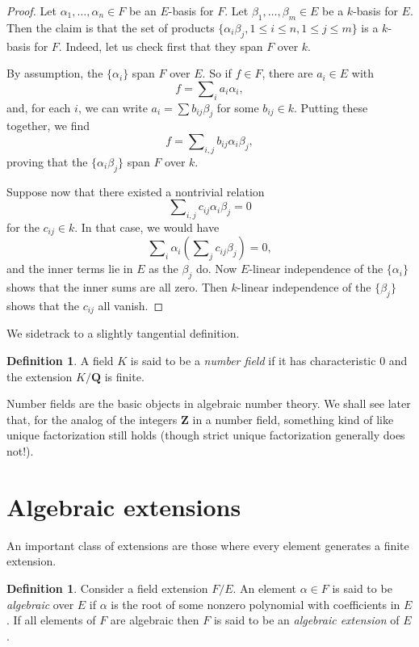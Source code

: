 \documentclass{stacks-project}
\theoremstyle{plain}
\theoremstyle{definition}
\newtheorem{definition}[subsection]{Definition}
\theoremstyle{remark}
\numberwithin{equation}{subsection}
\begin{document}
\begin{proof}
Let $\alpha_1, \ldots, \alpha_n \in F$ be an $E$-basis for $F$. Let
$\beta_1, \ldots, \beta_m \in E$ be a $k$-basis for $E$. Then the claim is
that the set of products
$\{\alpha_i \beta_j, 1 \leq i \leq n, 1 \leq j \leq m\}$
is a $k$-basis for $F$. Indeed, let us check first that they span $F$ over $k$.

\medskip\noindent
By assumption, the $\{\alpha_i\}$ span $F$ over $E$. So if
$f \in F$, there are $a_i \in E$ with
$$
f = \sum\nolimits_i a_i \alpha_i,
$$
and, for each $i$, we can write $a_i = \sum b_{ij} \beta_j$ for some
$b_{ij} \in k$. Putting these together, we find
$$
f = \sum\nolimits_{i,j} b_{ij} \alpha_i \beta_j,
$$
proving that the $\{\alpha_i \beta_j\}$ span $F$ over $k$.

\medskip\noindent
Suppose now that there existed a nontrivial relation
$$
\sum\nolimits_{i,j} c_{ij} \alpha_i \beta_j = 0
$$
for the $c_{ij} \in k$. In that case, we would have
$$
\sum\nolimits_i \alpha_i \left( \sum\nolimits_j c_{ij} \beta_j \right) = 0,
$$
and the inner terms lie in $E$ as the $\beta_j$ do. Now $E$-linear
independence of the $\{\alpha_i\}$ shows that the inner sums are all zero.
Then $k$-linear independence of the $\{\beta_j\}$ shows that the
$c_{ij}$ all vanish.
\end{proof}

\noindent
We sidetrack to a slightly tangential definition.

\begin{definition}
\label{definition-number-field}
A field $K$ is said to be a {\it number field} if it has characteristic
$0$ and the extension $K/\mathbf{Q}$ is finite.
\end{definition}

\noindent
Number fields are the basic objects in algebraic number theory. We shall see
later that,
for the analog of the integers $\mathbf{Z}$ in a number field, something kind
of like unique factorization still holds (though strict unique factorization
generally does not!).


\section{Algebraic extensions}
\label{section-algebraic-extensions}

\noindent
An important class of extensions are those where every element generates
a finite extension.

\begin{definition}
\label{definition-algebraic}
Consider a field extension $F/E$. An element $\alpha \in F$ is said to be
{\it algebraic} over $E$ if $\alpha$ is the root of some nonzero polynomial
with coefficients in $E$. If all elements of $F$ are algebraic then $F$ is
said to be an {\it algebraic extension} of $E$.
\end{definition}
\end{document}
